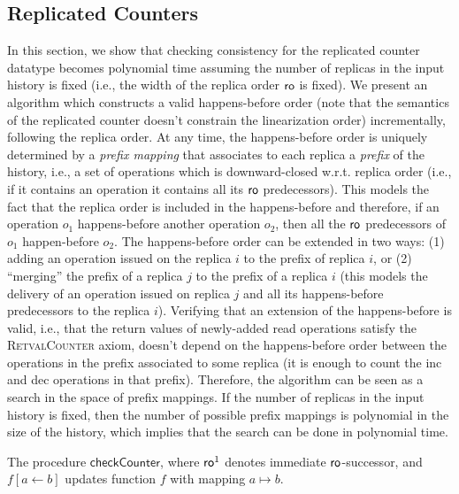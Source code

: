 \subsection{Replicated Counters}
\label{sec:counter}

In this section, we show that checking consistency for the replicated counter datatype becomes polynomial time assuming the number of replicas in the input history is fixed (i.e., the width of the replica order $\mathsf{ro}$ is fixed). We present an algorithm which constructs a valid happens-before order (note that the semantics of the replicated counter doesn't constrain the linearization order) incrementally, following the replica order. At any time, the happens-before order is uniquely determined by a \emph{prefix mapping} that associates to each replica a \emph{prefix} of the history, i.e., a set of operations which is downward-closed w.r.t. replica order (i.e., if it contains an operation it contains all its $\mathsf{ro}$ predecessors). This models the fact that the replica order is included in the happens-before and therefore, if an operation $o_1$ happens-before another operation $o_2$, then all the $\mathsf{ro}$ predecessors of $o_1$ happen-before $o_2$. The happens-before order can be extended in two ways: (1) adding an operation issued on the replica $i$ to the prefix of replica $i$, or (2) ``merging'' the prefix of a replica $j$ to the prefix of a replica $i$ (this models the delivery of an operation issued on replica $j$ and all its happens-before predecessors to the replica $i$). Verifying that an extension of the happens-before is valid, i.e., that the return values of newly-added {\sf read} operations satisfy the \textsc{RetvalCounter} axiom, doesn't depend on the happens-before order between the operations in the prefix associated to some replica (it is enough to count the {\sf inc} and {\sf dec} operations in that prefix). Therefore, the algorithm can be seen as a search in the space of prefix mappings. If the number of replicas in the input history is fixed, then the number of possible prefix mappings is polynomial in the size of the history, which implies that the search can be done in polynomial time.

\begin{algorithm}[t]
  {\footnotesize}
  \caption{The procedure $\mathsf{checkCounter}$, where $\mathsf{ro}^1$ denotes immediate $\mathsf{ro}$-successor, and $f[a\leftarrow b]$ updates function $f$ with mapping $a \mapsto b$.}
  \label{countercrdtalgo:main}
\end{algorithm}


